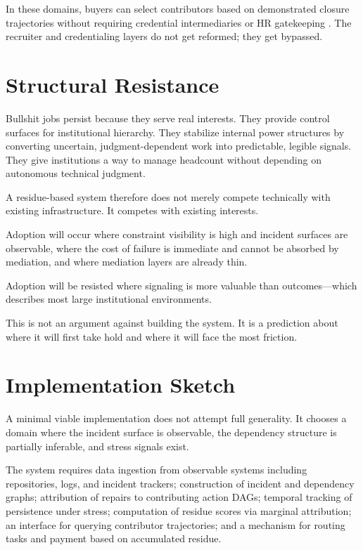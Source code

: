 \documentclass[12pt]{article}
\begin{document}
In these domains, buyers can select contributors based on demonstrated
closure trajectories without requiring credential intermediaries or HR
gatekeeping \cite{coase1937,williamson1985}. The recruiter and
credentialing layers do not get reformed; they get bypassed.

\section{Structural Resistance}

Bullshit jobs persist because they serve real interests. They provide
control surfaces for institutional hierarchy. They stabilize internal
power structures by converting uncertain, judgment-dependent work into
predictable, legible signals. They give institutions a way to manage
headcount without depending on autonomous technical judgment.

A residue-based system therefore does not merely compete technically
with existing infrastructure. It competes with existing interests.

Adoption will occur where constraint visibility is high and incident
surfaces are observable, where the cost of failure is immediate and
cannot be absorbed by mediation, and where mediation layers are already
thin.

Adoption will be resisted where signaling is more valuable than
outcomes---which describes most large institutional environments.

This is not an argument against building the system. It is a prediction
about where it will first take hold and where it will face the most
friction.

\section{Implementation Sketch}

A minimal viable implementation does not attempt full generality. It
chooses a domain where the incident surface is observable, the
dependency structure is partially inferable, and stress signals exist.

The system requires data ingestion from observable systems including
repositories, logs, and incident trackers; construction of incident and
dependency graphs; attribution of repairs to contributing action DAGs;
temporal tracking of persistence under stress; computation of residue
scores via marginal attribution; an interface for querying contributor
trajectories; and a mechanism for routing tasks and payment based on
accumulated residue.
\end{document}
